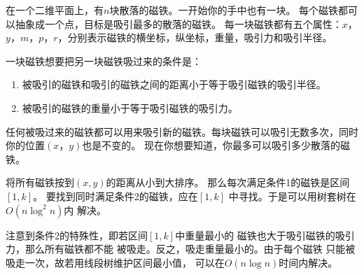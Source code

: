 \begin{prob}
	在一个二维平面上，有$n$块散落的磁铁。一开始你的手中也有一块。
	每个磁铁都可以抽象成一个点，目标是吸引最多的散落的磁铁。
	每一块磁铁都有五个属性：$x$，$y$，$m$，$p$，$r$，分别表示磁铁的横坐标，纵坐标，重量，吸引力和吸引半径。\par
	一块磁铁想要把另一块磁铁吸过来的条件是：
	\begin{enumerate}
		\item 被吸引的磁铁和吸引的磁铁之间的距离小于等于吸引磁铁的吸引半径。
		\item 被吸引的磁铁的重量小于等于吸引磁铁的吸引力。
	\end{enumerate}
	任何被吸过来的磁铁都可以用来吸引新的磁铁。每块磁铁可以吸引无数多次，同时你的位置$(x，y)$也是不变的。
	现在你想要知道，你最多可以吸引多少散落的磁铁。
\end{prob}

\begin{sol}
	将所有磁铁按到$(x,y)$的距离从小到大排序。
	那么每次满足条件1的磁铁是区间$[1,k]$。
	要找到同时满足条件2的磁铁，应在$[1,k]$
	中寻找。于是可以用树套树在$O(n \log^2 n)$内
	解决。\par
	注意到条件2的特殊性，即若区间$[1,k]$中重量最小的
	磁铁也大于吸引磁铁的吸引力，那么所有磁铁都不能
	被吸走。反之，吸走重量最小的。由于每个磁铁
	只能被吸走一次，故若用线段树维护区间最小值，
	可以在$O(n \log n)$时间内解决。
\end{sol}
